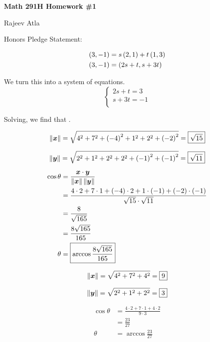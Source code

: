 \documentclass{article}
\begin{document}
\begin{center}
    \Large \textbf{Math 291H Homework \#1}
\end{center}
\begin{center}
    \Large Rajeev Atla
\end{center}


Honors Pledge Statement: 


\begin{align*}
  \left ( 3, -1 \right) &= s \left ( 2, 1 \right) + t \left ( 1, 3 \right) \\
  \left ( 3, -1 \right) &= \left ( 2s+t, s+3t \right) \\
\end{align*}

We turn this into a system of equations.
$$
\begin{cases}
  2s + t = 3 \\
  s+3t = -1 \\
\end{cases}
$$

Solving, we find that .



$$\left\lVert\bm{x}\right\rVert = \sqrt{4^2 + 7^2 + \left ( -4 \right)^2 + 1^2 + 2^2 + \left ( -2 \right)^2} =  \boxed{\sqrt{15}}$$

$$\left\lVert\bm{y}\right\rVert = \sqrt{2^2 + 1^2 + 2^2 + 2^2 + \left ( -1 \right)^2 + \left ( -1 \right)^2} = \boxed{\sqrt{11}}$$

\begin{align*}
  \cos \theta &= \frac{\bm{x} \cdot \bm{y}}{\left\lVert\bm{x}\right\rVert \left\lVert\bm{y}\right\rVert} \\
              &= \frac{4 \cdot 2 + 7 \cdot 1 + \left ( -4 \right) \cdot 2 + 1 \cdot \left ( -1 \right) + \left ( -2 \right) \cdot \left ( -1 \right)}{\sqrt{15} \cdot \sqrt{11}} \\
              &= \frac{8}{\sqrt{165}} \\
              &= \frac{8 \sqrt{165}}{165} \\
  \theta &= \boxed{\arccos{\frac{8 \sqrt{165}}{165}}} \\
\end{align*}



$$\left\lVert\bm{x}\right\rVert = \sqrt{4^2 + 7^2 + 4^2} =  \boxed{9}$$

$$\left\lVert\bm{y}\right\rVert = \sqrt{2^2 + 1^2 + 2^2} =  \boxed{3}$$

\begin{align*}
  \cos \theta &= \frac{4 \cdot 2 + 7 \cdot 1 + 4 \cdot 2}{9 \cdot 3} \\
              &= \frac{23}{27} \\
  \theta &= \boxed{\arccos \frac{23}{27}} \\
\end{align*}
\end{document}
